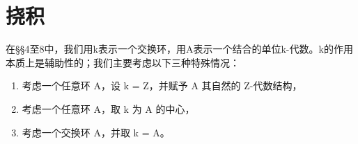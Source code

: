 \section{挠积}

在§§4至8中，我们用k表示一个交换环，用A表示一个结合的单位k-代数。k的作用本质上是辅助性的；我们主要考虑以下三种特殊情况：

\begin{enumerate}
\def\labelenumi{\alph{enumi})}
\item
  考虑一个任意环 A，设 k = Z，并赋予 A 其自然的 Z-代数结构，
\item
  考虑一个任意环 A，取 k 为 A 的中心，
\item
  考虑一个交换环 A，并取 k = A。
\end{enumerate}

